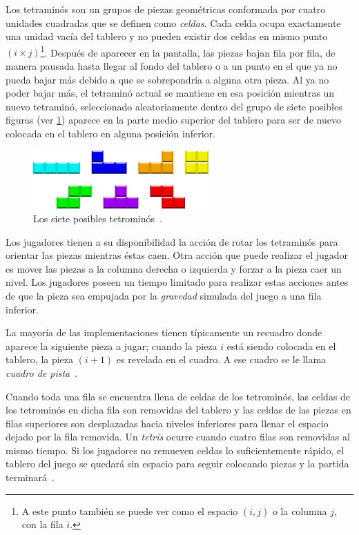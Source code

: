 Los tetraminós son un grupos de piezas geométricas conformada por cuatro
unidades cuadradas que se definen como \textit{celdas}. Cada celda ocupa
exactamente una unidad vacía del tablero y no pueden existir dos celdas en mismo
punto $(i \times j)$\footnote{A este punto también se puede ver como el espacio
  $(i,j)$ o la columna $j$, con la fila $i$.}. Después de aparecer en la
pantalla, las piezas bajan fila por fila, de manera pausada hasta llegar al
fondo del tablero o a un punto en el que ya no pueda bajar más debido a que se
sobrepondría a alguna otra pieza. Al ya no poder bajar más, el tetraminó
actual se mantiene en esa posición mientras un nuevo tetraminó, seleccionado
aleatoriamente dentro del grupo de siete posibles figuras (ver
\cref{fig:Tetrominos}) aparece en la parte medio superior del tablero para
ser de nuevo colocada en el tablero en alguna posición inferior.

\begin{figure}[h]
    \centering
    \includegraphics[width=0.6\textwidth]{./images/tetrominos}
    \caption{Los siete posibles tetrominós~\cite{WikipediaEN:tetrominos}.}
    \label{fig:Tetrominos}
\end{figure}


Los jugadores tienen a su disponibilidad la acción de rotar los tetraminós para
orientar las piezas mientras éstas caen. Otra acción que puede realizar el
jugador es mover las piezas a la columna derecha o izquierda y forzar a la 
pieza caer un nivel. Los jugadores
poseen un tiempo limitado para realizar estas acciones antes de que la pieza
sea empujada por la \textit{gravedad} simulada del juego a una fila inferior.

La mayoría de las implementaciones tienen típicamente un recuadro donde aparece
la siguiente pieza a jugar; cuando la pieza $i$ está siendo colocada en el
tablero, la pieza $(i + 1)$ es revelada en el cuadro. A ese cuadro se le llama 
\textit{cuadro de pista}~\cite{DBLP:journals/corr/cs-CC-0210020}.

Cuando toda una fila se encuentra llena de celdas de los tetrominós,
las celdas de los tetrominós en dicha fila son removidas del tablero y
las celdas de las piezas en filas superiores son desplazadas hacia niveles 
inferiores para llenar el espacio dejado por la fila removida. 
Un \textit{tetris} ocurre cuando cuatro filas son removidas al 
mismo tiempo. Si los jugadores no remueven
celdas lo suficientemente rápido, el tablero del juego se
quedará sin espacio para seguir colocando piezas y la partida
terminará~\cite{Burgiel97howto}.

